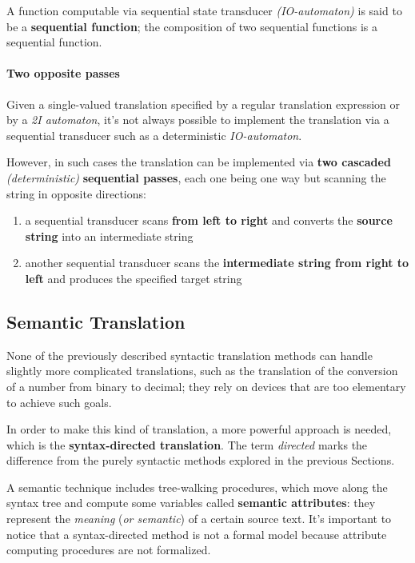 \documentclass[english]{article}
\begin{document}
A function computable via sequential state transducer \textit{(IO-automaton)} is said to be a \textbf{sequential function};
the composition of two sequential functions is a sequential function.

\paragraph{Two opposite passes}

Given a single-valued translation specified by a regular translation expression or by a \textit{2I automaton}, it's not always possible to implement the translation via a sequential transducer such as a deterministic \textit{IO-automaton}.

However, in such cases the translation can be implemented via \textbf{two cascaded} \textit{(deterministic)} \textbf{sequential passes}, each one being one way but scanning the string in opposite directions:

\begin{enumerate}[label=step \arabic*., ref=(step \arabic*), leftmargin=*, widest*=7, labelindent=1em]
  \item a sequential transducer scans \textbf{from left to right} and converts the \textbf{source string} into an intermediate string
  \item another sequential transducer scans the \textbf{intermediate string from right to left} and produces the specified target string
\end{enumerate}

\subsection{Semantic Translation}

None of the previously described syntactic translation methods can handle slightly more complicated translations, such as the translation of the conversion of a number from binary to decimal;
they rely on devices that are too elementary to achieve such goals.

In order to make this kind of translation, a more powerful approach is needed, which is the \textbf{syntax-directed translation}.
The term \textit{directed} marks the difference from the purely syntactic methods explored in the previous Sections.

A semantic technique includes tree-walking procedures, which move along the syntax tree and compute some variables called \textbf{semantic attributes}:
they represent the \textit{meaning} (\textit{or semantic}) of a certain source text.
It's important to notice that a syntax-directed method is not a formal model because attribute computing procedures are not formalized.
\end{document}
